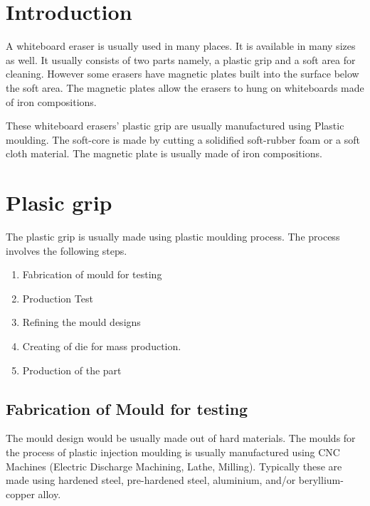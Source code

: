 \documentclass[12pt,a4paper,oneside]{article}
\begin{document}

\newpage
\tableofcontents
\listoffigures
\listoftables

\newpage
{}
\setcounter{page}{1}


\section{Introduction}

A whiteboard eraser is usually used in many places. It is available in many sizes as well. It usually consists of two parts namely, a plastic grip and a soft area for cleaning. However some erasers have magnetic plates built into the surface below the soft area. The magnetic plates allow the erasers to hung on whiteboards made of iron compositions. 

These whiteboard erasers’ plastic grip are usually manufactured using Plastic moulding. The soft-core is made by cutting a solidified soft-rubber foam or a soft cloth material. The magnetic plate is usually made of iron compositions. 



\newpage
\section{Plasic grip}

The plastic grip is usually made using plastic moulding process. The process involves the following steps. 

\begin{enumerate}
    \item Fabrication of mould for testing
    \item Production Test
    \item Refining the mould designs
    \item Creating of die for mass production.
    \item Production of the part
\end{enumerate}


\subsection{Fabrication of Mould for testing}

The mould design would be usually made out of hard materials. The moulds for the process of plastic injection moulding is usually manufactured using CNC Machines (Electric Discharge Machining, Lathe, Milling). Typically these are made using hardened steel, pre-hardened steel, aluminium, and/or beryllium-copper alloy.
\end{document}
